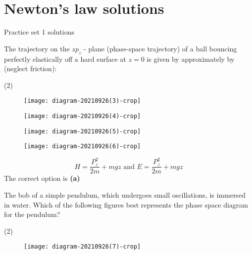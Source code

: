 \chapter{Newton's law solutions}
\begin{abox}
	Practice set 1 solutions
	\end{abox}
\begin{enumerate}
\begin{minipage}{\textwidth}
	\item The trajectory on the $z p_{z}$ - plane (phase-space trajectory) of a ball bouncing perfectly elastically off a hard surface at $z=0$ is given by approximately by (neglect friction):
\end{minipage}
\begin{tasks}(2)
	\task[\textbf{A.}]\begin{figure}[H]
		\centering
		\texttt{[image: diagram-20210926(3)-crop]}
	\end{figure}
	\task[\textbf{B.}]\begin{figure}[H]
		\centering
		\texttt{[image: diagram-20210926(4)-crop]}
	\end{figure}
	\task[\textbf{C.}]\begin{figure}[H]
		\centering
		\texttt{[image: diagram-20210926(5)-crop]}
	\end{figure}
	\task[\textbf{D.}]\begin{figure}[H]
		\centering
		\texttt{[image: diagram-20210926(6)-crop]}
	\end{figure}
\end{tasks}
\begin{answer}
	$$H=\frac{P_{z}^{2}}{2 m}+m g z \text { and } E=\frac{P_{z}^{2}}{2 m}+m g z$$
	The correct option is \textbf{(a)}
\end{answer}
\begin{minipage}{\textwidth}
	\item The bob of a simple pendulum, which undergoes small oscillations, is immersed in water. Which of the following figures best represents the phase space diagram for the pendulum?
\end{minipage}
\begin{tasks}(2)
	\task[\textbf{A.}]\begin{figure}[H]
		\centering
		\texttt{[image: diagram-20210926(7)-crop]}
	\end{figure}
	\task[\textbf{B.}]\begin{figure}[H]

\end{figure}
\end{tasks}
\end{enumerate}

